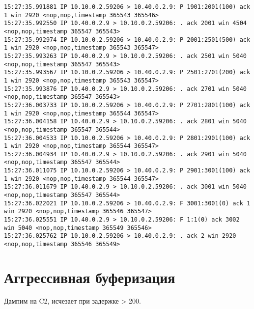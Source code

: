 \documentclass[a4paper,12pt]{article}
\begin{document}
\begin{Verbatim}
15:27:35.991881 IP 10.10.0.2.59206 > 10.40.0.2.9: P 1901:2001(100) ack 1 win 2920 <nop,nop,timestamp 365543 365546>
15:27:35.992550 IP 10.40.0.2.9 > 10.10.0.2.59206: . ack 2001 win 4504 <nop,nop,timestamp 365547 365543>
15:27:35.992974 IP 10.10.0.2.59206 > 10.40.0.2.9: P 2001:2501(500) ack 1 win 2920 <nop,nop,timestamp 365543 365547>
15:27:35.993263 IP 10.40.0.2.9 > 10.10.0.2.59206: . ack 2501 win 5040 <nop,nop,timestamp 365547 365543>
15:27:35.993567 IP 10.10.0.2.59206 > 10.40.0.2.9: P 2501:2701(200) ack 1 win 2920 <nop,nop,timestamp 365543 365547>
15:27:35.993876 IP 10.40.0.2.9 > 10.10.0.2.59206: . ack 2701 win 5040 <nop,nop,timestamp 365547 365543>
15:27:36.003733 IP 10.10.0.2.59206 > 10.40.0.2.9: P 2701:2801(100) ack 1 win 2920 <nop,nop,timestamp 365544 365547>
15:27:36.004158 IP 10.40.0.2.9 > 10.10.0.2.59206: . ack 2801 win 5040 <nop,nop,timestamp 365547 365544>
15:27:36.004533 IP 10.10.0.2.59206 > 10.40.0.2.9: P 2801:2901(100) ack 1 win 2920 <nop,nop,timestamp 365544 365547>
15:27:36.004934 IP 10.40.0.2.9 > 10.10.0.2.59206: . ack 2901 win 5040 <nop,nop,timestamp 365547 365544>
15:27:36.011075 IP 10.10.0.2.59206 > 10.40.0.2.9: P 2901:3001(100) ack 1 win 2920 <nop,nop,timestamp 365544 365547>
15:27:36.011679 IP 10.40.0.2.9 > 10.10.0.2.59206: . ack 3001 win 5040 <nop,nop,timestamp 365547 365544>
15:27:36.022021 IP 10.10.0.2.59206 > 10.40.0.2.9: F 3001:3001(0) ack 1 win 2920 <nop,nop,timestamp 365546 365547>
15:27:36.025551 IP 10.40.0.2.9 > 10.10.0.2.59206: F 1:1(0) ack 3002 win 5040 <nop,nop,timestamp 365549 365546>
15:27:36.025762 IP 10.10.0.2.59206 > 10.40.0.2.9: . ack 2 win 2920 <nop,nop,timestamp 365546 365549>

\end{Verbatim}

\section{Аггрессивная буферизация}

Дампим на C2, исчезает при задержке > 200.
\end{document}
